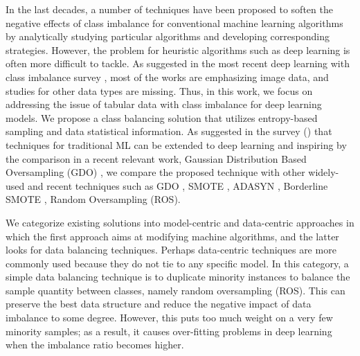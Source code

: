 In the last decades, a number of techniques have been proposed to soften the negative effects of class imbalance for conventional machine learning algorithms by analytically studying particular algorithms and developing corresponding strategies. However, the problem for heuristic algorithms such as deep learning is often more difficult to tackle. As suggested in the most recent deep learning with class imbalance survey \cite{johnson_survey_2019}, most of the works are emphasizing image data, and studies for other data types are missing. Thus, in this work, we focus on addressing the issue of tabular data with class imbalance for deep learning models. We propose a class balancing solution that utilizes entropy-based sampling and data statistical information. As suggested in the survey (\cite{johnson_survey_2019}) that techniques for traditional ML can be extended to deep learning and inspiring by the comparison in a recent relevant work, Gaussian Distribution Based Oversampling (GDO) \cite{bib:GDO}, we compare the proposed technique with other widely-used and recent techniques such as GDO \cite{bib:GDO}, SMOTE \cite{chawla_smote:_2002}, ADASYN \cite{ADASYN}, Borderline SMOTE \cite{bordersmote}, Random Oversampling (ROS). 

We categorize existing solutions into model-centric and data-centric approaches in which the first approach aims at modifying machine algorithms, and the latter looks for data balancing techniques. Perhaps data-centric techniques are more commonly used because they do not tie to any specific model. In this category, a simple data balancing technique is to duplicate minority instances to balance the sample quantity between classes, namely random oversampling (ROS). This can preserve the best data structure and reduce the negative impact of data imbalance to some degree. However, this puts too much weight on a very few minority samples; as a result, it causes over-fitting problems in deep learning when the imbalance ratio becomes higher. 

